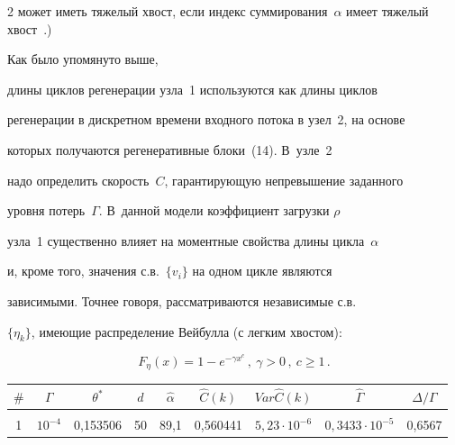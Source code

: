 \begin{multicols}{2}
может иметь тяжелый хвост,  если индекс суммирования~$\alpha$ имеет тяжелый хвост~\cite{HT}.) 

Как было упомянуто выше,

длины цик\-лов регенерации  узла~1 используются  как длины циклов

регенерации в дискретном времени входного потока в узел~2, на основе

которых получаются регенеративные блоки~(14). В~узле~2

надо определить скорость~$C$, гарантирующую  непревышение заданного

уровня потерь~$\Gamma$.  В~данной модели коэффициент загрузки $\rho$

узла~1 существенно влияет на моментные свойства длины цикла~$\alpha$

и, кроме того,  значения с.в.\ $\{v_i\}$ на одном цикле являются

зависимыми. Точнее говоря, рассматриваются  независимые с.в.\

$\{\eta_k\}$, имеющие распределение Вейбулла (с легким хвостом):

\begin{equation*}

F_\eta (x) = 1 - e^{-\gamma x^c}\,, \ \gamma > 0\,, \ c \ge 1\,.


\end{equation*}



\begin{table}\small

\begin{center}


\vspace*{2ex}



\begin{tabular}{|c|c|c|c|c|c|c|c|c|}

\hline

$\#$ & $\Gamma$ & $\theta^*$ & $d$& $\hat\alpha$ &$\hat{C}(k)$ & $Var \hat{C}(k)$ & $\hat\Gamma$ & $\Delta/\Gamma$\\

\hline 

&&&&&&&&\\[-9pt]

1 &  $10^{-4}$ &  0,153506 & 50 & \hphantom{9}89,1 & 0,560441 & $5{,}23\cdot 10^{-6}$  & $0{,}3433 \cdot 10^{-5}$ & 0,6567\\


\end{tabular}
\end{center}
\end{table}
\end{multicols}
